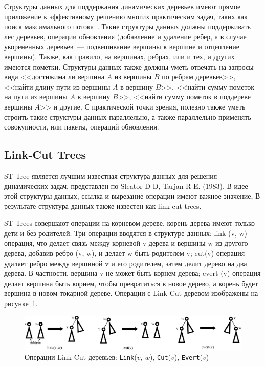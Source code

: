 \documentclass[specification,annotation,times]{itmo-student-thesis}
\newcommand{\revise}[1]{{\color{red!70!black} #1 }}
\begin{document}
Структуры данных для поддержания динамических деревьев имеют прямое приложение к эффективному решению многих практическим задач,
таких как поиск максимального потока~\cite{goldberg88}. Такие структуры данных должны поддерживать лес деревьев,
операции обновления (добавление и удаление ребер, а в случае укорененных деревьев~--- подвешивание вершины к вершине и отцепление вершины).
Также, как правило, на вершинах, ребрах, или и тех, и других имеются пометки. Структуры данных также должны уметь отвечать на запросы
вида <<достижима ли вершина $A$ из вершины $B$ по ребрам деревьев>>, <<найти длину пути из вершины $A$ в вершину $B$>>,
<<найти сумму пометок на пути из вершины $A$ в вершину $B$>>, <<найти сумму пометок в поддереве вершины $A$>> и другие.
С практической точки зрения, полезно также уметь строить такие структуры данных параллельно, а также параллельно применять совокупности, или пакеты, операций обновления.

\subsection{Link-Cut Trees}

\revise{
ST-Tree является лучшим известная структура данных для решения динамических задач, представлен по Sleator D D, Tarjan R E. (1983). В идее этой структуры данных, ссылка и вырезание операции имеют важное 
значение, В результате структура данных также известен как link-cut trees.
}

\revise{
ST-Trees совершают операции на корневом дереве, корень дерева имеют только дети и без родителей. Три операции вводятся в структуре данных: link (v, w) операция, что делает связь между корневой v дерева и 
вершины w из другого дерева, добавив ребро (v, w), и делает w быть родителем v; cut(v) операция удаляет ребро между вершиной v и его родителем, затем делит дерево на два дерева. В частности, вершина v не 
может быть корнем дерева; evert (v) операция делает вершина быть корнем, чтобы превратиться в новое дерево, а корень будет вершина в новом токарной дереве. Операции с Link-Cut деревом изображены на 
рисунке~\ref{fig:link-cut-tree}.
}

\begin{figure}[!ht]
\centering
\includegraphics[width=\textwidth]{pic/link-cut-tree.png}
\caption{Операции Link-Cut деревьев: \texttt{Link}($v$, $w$), \texttt{Cut}($v$), \texttt{Evert}($v$)}\label{fig:link-cut-tree}
\end{figure}
\end{document}
